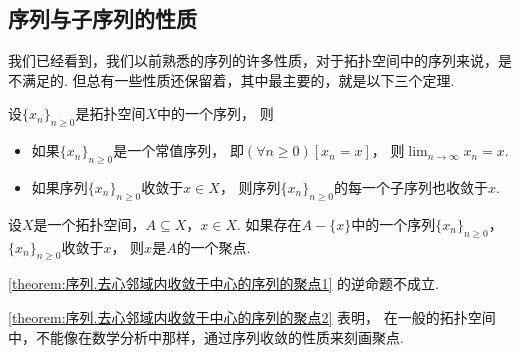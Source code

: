 \subsection{序列与子序列的性质}
我们已经看到，我们以前熟悉的序列的许多性质，对于拓扑空间中的序列来说，是不满足的.
但总有一些性质还保留着，其中最主要的，就是以下三个定理.

\begin{theorem}
设\(\{x_n\}_{n\geq0}\)是拓扑空间\(X\)中的一个序列，
则\begin{itemize}
	\item 如果\(\{x_n\}_{n\geq0}\)是一个常值序列，
	即\((\forall n\geq0)[x_n=x]\)，
	则\(\lim_{n\to\infty} x_n = x\).
	\item 如果序列\(\{x_n\}_{n\geq0}\)收敛于\(x \in X\)，
	则序列\(\{x_n\}_{n\geq0}\)的每一个子序列也收敛于\(x\).
\end{itemize}
\end{theorem}

\begin{theorem}\label{theorem:序列.去心邻域内收敛于中心的序列的聚点1}
设\(X\)是一个拓扑空间，\(A \subseteq X\)，\(x \in X\).
如果存在\(A-\{x\}\)中的一个序列\(\{x_n\}_{n\geq0}\)，
\(\{x_n\}_{n\geq0}\)收敛于\(x\)，
则\(x\)是\(A\)的一个聚点.
\end{theorem}

\begin{proposition}\label{theorem:序列.去心邻域内收敛于中心的序列的聚点2}
\cref{theorem:序列.去心邻域内收敛于中心的序列的聚点1} 的逆命题不成立.
\end{proposition}

\cref{theorem:序列.去心邻域内收敛于中心的序列的聚点2} 表明，
在一般的拓扑空间中，不能像在数学分析中那样，通过序列收敛的性质来刻画聚点.

